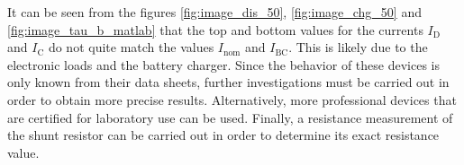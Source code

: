 It can be seen from the figures \ref{fig:image_dis_50}, \ref{fig:image_chg_50} and \ref{fig:image_tau_b_matlab} that the top and bottom values for the currents $I_\mathrm{D}$ and $I_\mathrm{C}$ do not quite match the values $I_\mathrm{nom}$ and $I_\mathrm{BC}$. This is likely due to the electronic loads and the battery charger. Since the behavior of these devices is only known from their data sheets, further investigations must be carried out in order to obtain more precise results. Alternatively, more professional devices that are certified for laboratory use can be used. Finally, a resistance measurement of the shunt resistor can be carried out in order to determine its exact resistance value.
